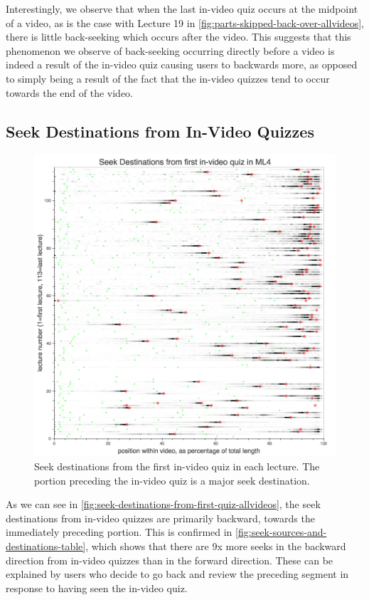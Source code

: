 \documentclass{sigchi}
\begin{document}
Interestingly, we observe that when the last in-video quiz occurs at the midpoint of a video, as is the case with Lecture 19 in \autoref{fig:parts-skipped-back-over-allvideos}, there is little back-seeking which occurs after the video. This suggests that this phenomenon we observe of back-seeking occurring directly before a video is indeed a result of the in-video quiz causing users to backwards more, as opposed to simply being a result of the fact that the in-video quizzes tend to occur towards the end of the video.

\subsection{Seek Destinations from In-Video Quizzes}

\begin{figure}
\includegraphics[width=1.0\columnwidth]{seek-destinations-from-first-quiz-allvideos}
\caption{Seek destinations from the first in-video quiz in each lecture. The portion preceding the in-video quiz is a major seek destination.}
\label{fig:seek-destinations-from-first-quiz-allvideos}
\end{figure}

As we can see in \autoref{fig:seek-destinations-from-first-quiz-allvideos}, the seek destinations from in-video quizzes are primarily backward, towards the immediately preceding portion. This is confirmed in \autoref{fig:seek-sources-and-destinations-table}, which shows that there are 9x more seeks in the backward direction from in-video quizzes than in the forward direction. These can be explained by users who decide to go back and review the preceding segment in response to having seen the in-video quiz.
\end{document}
